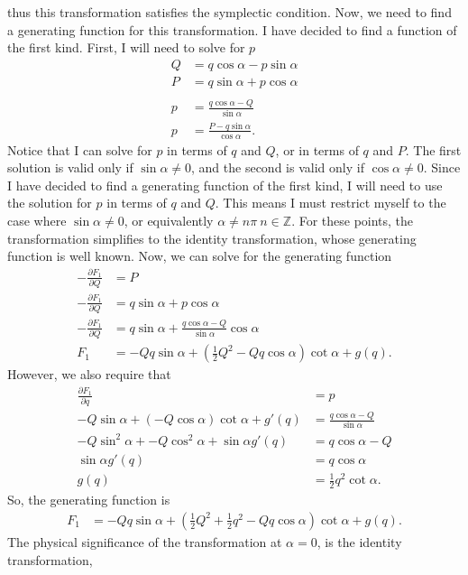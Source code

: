 \documentclass[10pt]{article}
\begin{document}
thus this transformation satisfies the symplectic condition.  Now, we need to
find a generating function for this transformation.  I have decided to find
a function of the first kind.  First, I will need to solve for $p$
\begin{align*}
  Q &= q\cos\alpha-p\sin\alpha\\
  P &= q\sin\alpha+p\cos\alpha\\
  \\
  p &= \frac{q\cos\alpha-Q}{\sin\alpha}\\
  p &= \frac{P-q\sin\alpha}{\cos\alpha}.
\end{align*}
Notice that I can solve for $p$ in terms of $q$ and $Q$, or in terms of $q$ and
$P$.  The first solution is valid only if $\sin\alpha\neq0$, and the second is
valid only if $\cos\alpha\neq0$.  Since I have decided to find a generating 
function of the first kind, I will need to use the solution for $p$ in terms of
$q$ and $Q$.  This means I must restrict myself to the case where 
$\sin\alpha\neq0$, or equivalently $\alpha\neq n\pi\ n\in\mathbb{Z}$.  For these
points, the transformation simplifies to the identity transformation, whose 
generating function is well known.  Now, we can solve for the generating function
\begin{align*}
  -\frac{\partial F_1}{\partial Q} &= P\\
  -\frac{\partial F_1}{\partial Q} &= q\sin\alpha+p\cos\alpha\\
  -\frac{\partial F_1}{\partial Q} &= q\sin\alpha+\frac{q\cos\alpha-Q}{\sin\alpha}\cos\alpha\\
  F_1 &= -Qq\sin\alpha+\left( \frac{1}{2}Q^2-Qq\cos\alpha \right)\cot\alpha+g(q).
\end{align*}
However, we also require that
\begin{align*}
  \frac{\partial F_1}{\partial q} &= p\\
  -Q\sin\alpha+\left( -Q\cos\alpha \right)\cot\alpha+g'(q) &=  \frac{q\cos\alpha-Q}{\sin\alpha}\\
  -Q\sin^2\alpha+ -Q\cos^2\alpha+\sin\alpha g'(q) &=  q\cos\alpha-Q\\
  \sin\alpha g'(q) &=  q\cos\alpha\\
  g(q) &=  \frac{1}{2}q^2\cot\alpha.
\end{align*}
So, the generating function is
\begin{align*}
  F_1 &= -Qq\sin\alpha+\left( \frac{1}{2}Q^2+\frac{1}{2}q^2-Qq\cos\alpha \right)\cot\alpha+g(q).
\end{align*}
The physical significance of the transformation at $\alpha=0$, is the identity transformation,
\end{document}
